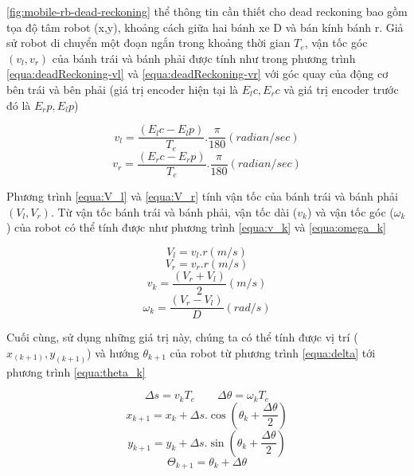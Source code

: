 \figurename{\ref{fig:mobile-rb-dead-reckoning}} thể thông tin cần thiết cho dead reckoning
bao gồm tọa độ tâm robot (x,y), khoảng cách giữa hai bánh xe D và bán kính bánh r.
Giả sử robot di chuyển một đoạn ngắn trong khoảng thời gian ${T}_{e}$, vận tốc góc $({v}_{l}, {v}_{r})$ của bánh trái và bánh phải được tính như trong phương trình \ref{equa:deadReckoning-vl} và \ref{equa:deadReckoning-vr} với góc quay của động cơ bên trái và bên phải (giá trị encoder hiện tại là ${E}_{l}c, {E}_{r}c$ và giá trị encoder trước đó là ${E}_{r}p, {E}_{l}p$)

\begin{equation}
  {v}_{l} = \frac{({E}_{l}c - {E}_{l}p)}{{T}_{e}}.\frac{\pi}{180}  (radian/sec)
  \label{equa:deadReckoning-vl}
\end{equation}
\begin{equation}
  {v}_{r} = \frac{({E}_{r}c - {E}_{r}p)}{{T}_{e}}.\frac{\pi}{180}  (radian/sec)
  \label{equa:deadReckoning-vr}
\end{equation}

Phương trình \ref{equa:V_l} và \ref{equa:V_r} tính vận tốc của bánh trái và bánh phải $({V}_{l}, {V}_{r})$. Từ vận tốc bánh trái và bánh phải, vận tốc dài (${v}_{k}$) và vận tốc góc (${\omega}_{k}$) của robot có thể tính được như phương trình \ref{equa:v_k} và \ref{equa:omega_k}

\begin{equation}
  {V}_{l} = {v}_{l}.r (m/s)
  \label{equa:V_l}
\end{equation}
\begin{equation}
  {V}_{r} = {v}_{r}.r (m/s)
  \label{equa:V_r}
\end{equation}
\begin{equation}
  {v}_{k} = \frac{({V}_{r}+{V}_{l})}{2} (m/s)
  \label{equa:v_k}
\end{equation}
\begin{equation}
  {\omega}_{k} = \frac{({V}_{r}-{V}_{l})}{D} (rad/s)
  \label{equa:omega_k}
\end{equation}

Cuối cùng, sử dụng những giá trị này, chúng ta có thể tính được vị trí (${x}_{(k+1)},{y}_{(k+1)}$) và hướng ${\theta}_{k+1}$ của robot từ phương trình \ref{equa:delta} tới phương trình \ref{equa:theta_k}

\begin{equation}
  {\Delta}s = {v}_{k}{T}_{e} \qquad
  {\Delta}{\theta} = {\omega}_{k}{T}_{e}
  \label{equa:delta}
\end{equation}
\begin{equation}
  {x}_{k+1} = {x}_{k} + {\Delta}s .{\cos} \left( {\theta}_{k}+\frac{{\Delta}{\theta}}{2} \right)
  \label{equa:x_kp1}
\end{equation}
\begin{equation}
  {y}_{k+1} = {y}_{k} + {\Delta}s .{\sin} \left( {\theta}_{k}+\frac{{\Delta}{\theta}}{2} \right)
  \label{equa:y_kp1}
\end{equation}
\begin{equation}
  {\Theta}_{k+1} = {\theta}_{k} + {\Delta}{\theta}
  \label{equa:theta_k}
\end{equation}

